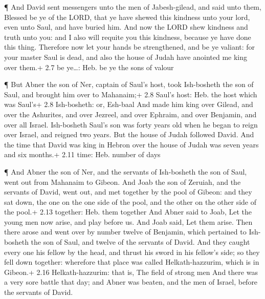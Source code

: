  ¶ And David sent messengers unto the men of Jabesh-gilead,
and said unto them, Blessed be ye of the LORD, that ye have shewed this
kindness unto your lord, even unto Saul, and have buried him.
 And now the LORD shew kindness and truth unto you: and I
also will requite you this kindness, because ye have done this thing.
 Therefore now let your hands be strengthened, and be ye
valiant: for your master Saul is dead, and also the house of Judah have
anointed me king over them.+ 2.7 be ye\ldots: Heb. be ye the sons of
valour

 ¶ But Abner the son of Ner, captain of Saul's host, took
Ish-bosheth the son of Saul, and brought him over to Mahanaim;+ 2.8
Saul's host: Heb. the host which was Saul's+ 2.8 Ish-bosheth: or,
Esh-baal  And made him king over Gilead, and over the
Ashurites, and over Jezreel, and over Ephraim, and over Benjamin, and
over all Israel.  Ish-bosheth Saul's son was forty years
old when he began to reign over Israel, and reigned two years. But the
house of Judah followed David.  And the time that David was
king in Hebron over the house of Judah was seven years and six months.+
2.11 time: Heb. number of days

 ¶ And Abner the son of Ner, and the servants of
Ish-bosheth the son of Saul, went out from Mahanaim to Gibeon.
 And Joab the son of Zeruiah, and the servants of David,
went out, and met together by the pool of Gibeon: and they sat down, the
one on the one side of the pool, and the other on the other side of the
pool.+ 2.13 together: Heb. them together  And Abner said to
Joab, Let the young men now arise, and play before us. And Joab said,
Let them arise.  Then there arose and went over by number
twelve of Benjamin, which pertained to Ish-bosheth the son of Saul, and
twelve of the servants of David.  And they caught every one
his fellow by the head, and thrust his sword in his fellow's side; so
they fell down together: wherefore that place was called
Helkath-hazzurim, which is in Gibeon.+ 2.16 Helkath-hazzurim: that is,
The field of strong men  And there was a very sore battle
that day; and Abner was beaten, and the men of Israel, before the
servants of David.

